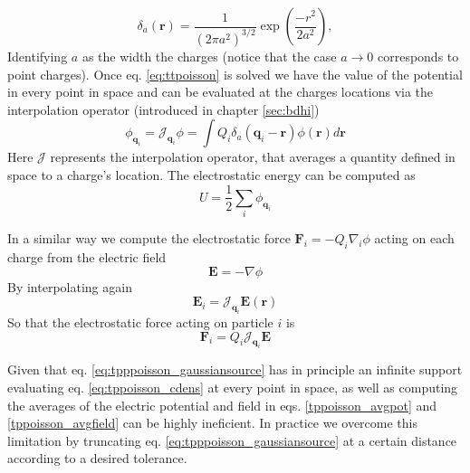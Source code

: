 \documentclass[ twoside,openright,titlepage,numbers=noenddot,%
headinclude,footinclude,cleardoublepage=empty,abstract=on,
BCOR=5mm,paper=a4,fontsize=11pt, dvipsnames
]{scrreprt}
\renewcommand{\vec}[1]{\bm{#1}}
\newcommand{\oper}[1]{\mathcal{#1}}
\newcommand{\ppos}{q}
\newcommand{\fpos}{r}
\begin{document}
\begin{equation}
  \label{eq:tpppoisson_gaussiansource}
  \delta_a(\vec{r})=\frac{1}{\left(2\pi a^2\right)^{3/2}}\exp{\left(\frac{-r^2}{2a^2}\right)},
\end{equation}
Identifying $a$ as the width the charges (notice that the case $a\rightarrow 0$ corresponds to point charges).
Once eq. \eqref{eq:ttpoisson} is solved we have the value of the potential in every point in space and can be evaluated at the charges locations via the interpolation operator (introduced in chapter \ref{sec:bdhi})
\begin{equation}  
  \phi_{\vec{\ppos}_i} = \oper{J}_{\vec{\ppos}_i}\phi = \int Q_i\delta_a(\vec{\ppos}_i - \vec{\fpos})\phi(\vec{\fpos})d\vec{\fpos}
\end{equation}
Here $\oper{J}$ represents the interpolation operator, that averages a quantity defined in space to a charge's location.
The electrostatic energy can be computed as
\begin{equation}
  \label{tppoisson_avgpot}
  U =  \frac{1}{2}\sum_i{\phi_{\vec{\ppos}_i}} 
\end{equation}

In a similar way we compute the electrostatic force $\vec{F}_i = -Q_i\nabla_i{\phi}$ acting on each charge from the electric field
\begin{equation}
  \label{eq:tppoisson_fieldnablaphi}
  \vec{E} = -\nabla{\phi}
\end{equation}
By interpolating again
\begin{equation}
  \label{tppoisson_avgfield}
\vec{E}_i = \oper{J}_{\vec{\ppos}_i}\vec{E}(\vec{\fpos})
\end{equation}
So that the electrostatic force acting on particle $i$ is
\begin{equation}
  \label{eq:tppoisson_force}
\vec{F}_i = Q_i\oper{J}_{\vec{\ppos}_i}\vec{E}
\end{equation}

Given that eq. \eqref{eq:tpppoisson_gaussiansource} has in principle an infinite support evaluating eq. \eqref{eq:tppoisson_cdens} at every point in space, as well as computing the averages of the electric potential and field in eqs. \eqref{tppoisson_avgpot} and \eqref{tppoisson_avgfield} can be highly ineficient. In practice we overcome this limitation by truncating eq. \eqref{eq:tpppoisson_gaussiansource} at a certain distance according to a desired tolerance.
\end{document}
